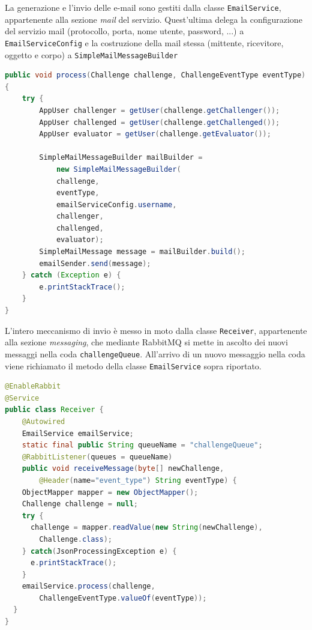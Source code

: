 La generazione e l'invio delle e-mail sono gestiti dalla classe \texttt{EmailService}, appartenente alla sezione \textit{mail} del servizio. Quest'ultima delega la configurazione del servizio mail (protocollo, porta, nome utente, password, ...) a \texttt{EmailServiceConfig} e la costruzione della mail stessa (mittente, ricevitore, oggetto e corpo) a \texttt{SimpleMailMessageBuilder}
\begin{lstlisting}[language=Java, caption=Generazione corpo email, basicstyle=\footnotesize]
public void process(Challenge challenge, ChallengeEventType eventType)
{
    try {
        AppUser challenger = getUser(challenge.getChallenger());
        AppUser challenged = getUser(challenge.getChallenged());
        AppUser evaluator = getUser(challenge.getEvaluator());
        
        SimpleMailMessageBuilder mailBuilder = 
            new SimpleMailMessageBuilder(
            challenge,
            eventType,
            emailServiceConfig.username,
            challenger,
            challenged,
            evaluator);
        SimpleMailMessage message = mailBuilder.build();
        emailSender.send(message);
    } catch (Exception e) {
        e.printStackTrace();
    }
}
\end{lstlisting}

L'intero meccanismo di invio è messo in moto dalla classe \texttt{Receiver}, appartenente alla sezione \textit{messaging}, che mediante RabbitMQ si mette in ascolto dei nuovi messaggi nella coda \texttt{challengeQueue}. All'arrivo di un nuovo messaggio nella coda viene richiamato il metodo della classe \texttt{EmailService} sopra riportato.

\begin{lstlisting}[language=Java, caption=Ricezione update ed invio notifica, basicstyle=\footnotesize]
@EnableRabbit
@Service
public class Receiver {
    @Autowired
    EmailService emailService;
    static final public String queueName = "challengeQueue";
    @RabbitListener(queues = queueName)
    public void receiveMessage(byte[] newChallenge, 
        @Header(name="event_type") String eventType) {
    ObjectMapper mapper = new ObjectMapper();
    Challenge challenge = null;
    try {
      challenge = mapper.readValue(new String(newChallenge), 
        Challenge.class);
    } catch(JsonProcessingException e) {
      e.printStackTrace();
    }
    emailService.process(challenge, 
        ChallengeEventType.valueOf(eventType));
  }
}
\end{lstlisting}